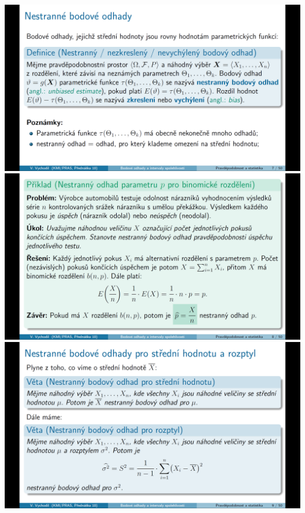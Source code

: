 \documentclass[12pt,a4paper]{article}
\begin{document}
\begin{center}
	\includegraphics[scale=0.26]{img/bodove_odhady_5}
	\includegraphics[scale=0.26]{img/bodove_odhady_6}
	\includegraphics[scale=0.26]{img/bodove_odhady_7}
\end{center}
\end{document}
